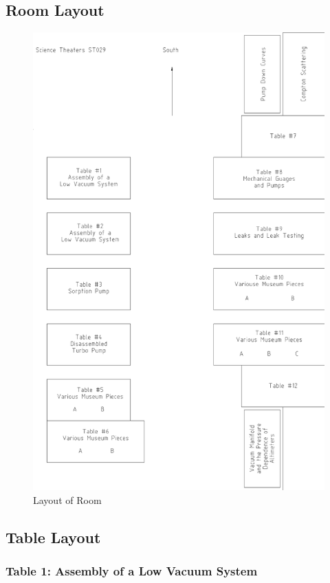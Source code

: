 \documentclass{book}
\begin{document}
\subsection{Room Layout}

\begin{figure}[H]
\includegraphics[scale=1.0]{room-layout.eps}
\caption{Layout of Room}
\label{Layout of Room}
\end{figure}

\subsection{Table Layout}

\subsubsection{Table 1: Assembly of a Low Vacuum System}
\end{document}
